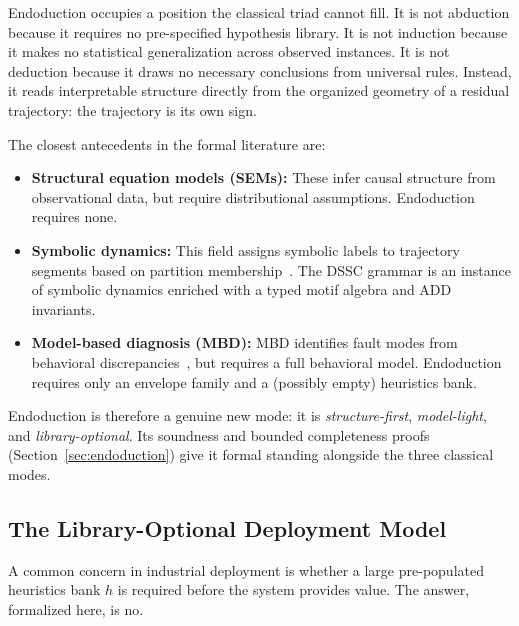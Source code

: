 \documentclass[11pt,a4paper]{article}
\theoremstyle{plain}
\theoremstyle{definition}
\theoremstyle{remark}
\begin{document}
Endoduction occupies a position the classical triad cannot fill. It is not abduction because it
requires no pre-specified hypothesis library. It is not induction because it makes no statistical
generalization across observed instances. It is not deduction because it draws no necessary
conclusions from universal rules. Instead, it reads interpretable structure directly from the
organized geometry of a residual trajectory: the trajectory is its own sign.

The closest antecedents in the formal literature are:
\begin{itemize}[nosep]
  \item \textbf{Structural equation models (SEMs):} These infer causal structure from
    observational data, but require distributional assumptions. Endoduction requires none.
  \item \textbf{Symbolic dynamics:} This field assigns symbolic labels to trajectory segments
    based on partition membership~\cite{symbolic_dynamics}. The DSSC grammar is an instance of
    symbolic dynamics enriched with a typed motif algebra and ADD invariants.
  \item \textbf{Model-based diagnosis (MBD):} MBD identifies fault modes from behavioral
    discrepancies~\cite{mbd}, but requires a full behavioral model. Endoduction requires only
    an envelope family and a (possibly empty) heuristics bank.
\end{itemize}

Endoduction is therefore a genuine new mode: it is \emph{structure-first}, \emph{model-light},
and \emph{library-optional}. Its soundness and bounded completeness proofs (Section~\ref{sec:endoduction})
give it formal standing alongside the three classical modes.

\subsection{The Library-Optional Deployment Model}
\label{sec:library_optional}

A common concern in industrial deployment is whether a large pre-populated heuristics bank $h$
is required before the system provides value. The answer, formalized here, is no.
\end{document}
